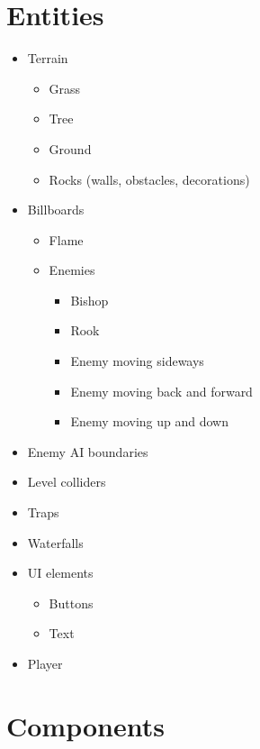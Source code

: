 \documentclass[12pt, english]{article}
\begin{document}
\section{Entities}
\begin{itemize}
	\item Terrain
	      \begin{itemize}
		      \item Grass
		      \item Tree
		      \item Ground
		      \item Rocks (walls, obstacles, decorations)
	      \end{itemize}
	\item Billboards
	      \begin{itemize}
		      \item Flame
		      \item Enemies
		            \begin{itemize}
			            \item Bishop
			            \item Rook
			            \item Enemy moving sideways
			            \item Enemy moving back and forward
			            \item Enemy moving up and down
		            \end{itemize}
	      \end{itemize}
	\item Enemy AI boundaries
	\item Level colliders
	\item Traps
	\item Waterfalls
	\item UI elements
	      \begin{itemize}
		      \item Buttons
		      \item Text
	      \end{itemize}
	\item Player
\end{itemize}


\section{Components}
\end{document}
